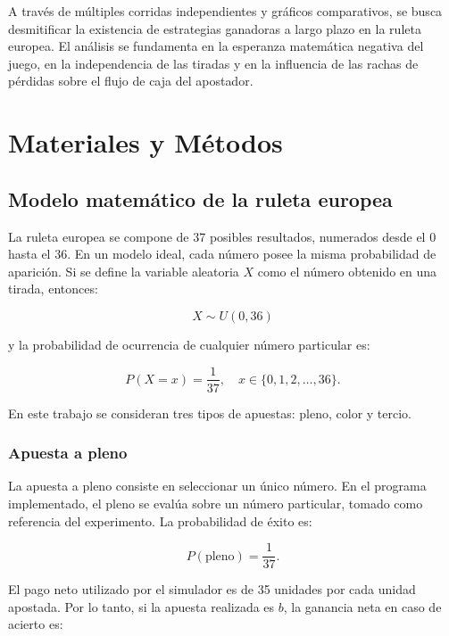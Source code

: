 \documentclass{article}
\begin{document}
A través de múltiples corridas independientes y gráficos comparativos, se busca desmitificar la existencia de estrategias ganadoras a largo plazo en la ruleta europea. El análisis se fundamenta en la esperanza matemática negativa del juego, en la independencia de las tiradas y en la influencia de las rachas de pérdidas sobre el flujo de caja del apostador.

\newpage

\section{Materiales y Métodos}

\subsection{Modelo matemático de la ruleta europea}

La ruleta europea se compone de 37 posibles resultados, numerados desde el 0 hasta el 36. En un modelo ideal, cada número posee la misma probabilidad de aparición. Si se define la variable aleatoria $X$ como el número obtenido en una tirada, entonces:

\begin{equation}
    X \sim U(0,36)
\end{equation}

y la probabilidad de ocurrencia de cualquier número particular es:

\begin{equation}
    P(X=x)=\frac{1}{37}, \quad x \in \{0,1,2,\dots,36\}.
\end{equation}

En este trabajo se consideran tres tipos de apuestas: pleno, color y tercio.

\subsubsection{Apuesta a pleno}

La apuesta a pleno consiste en seleccionar un único número. En el programa implementado, el pleno se evalúa sobre un número particular, tomado como referencia del experimento. La probabilidad de éxito es:

\begin{equation}
    P(\text{pleno})=\frac{1}{37}.
\end{equation}

El pago neto utilizado por el simulador es de 35 unidades por cada unidad apostada. Por lo tanto, si la apuesta realizada es $b$, la ganancia neta en caso de acierto es:
\end{document}
